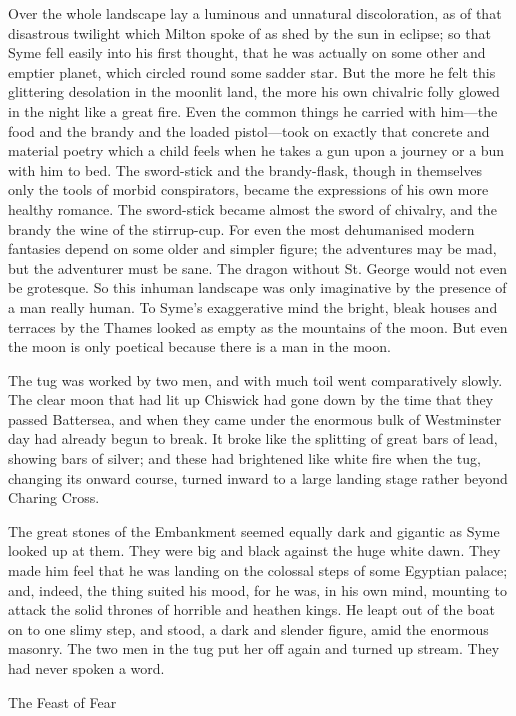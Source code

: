 Over the whole landscape lay a luminous and unnatural discoloration, as of that disastrous twilight which Milton spoke of as shed by the sun in eclipse; so that Syme fell easily into his first thought, that he was actually on some other and emptier planet, which circled round some sadder star. But the more he felt this glittering desolation in the moonlit land, the more his own chivalric folly glowed in the night like a great fire. Even the common things he carried with him⁠—the food and the brandy and the loaded pistol⁠—took on exactly that concrete and material poetry which a child feels when he takes a gun upon a journey or a bun with him to bed. The sword-stick and the brandy-flask, though in themselves only the tools of morbid conspirators, became the expressions of his own more healthy romance. The sword-stick became almost the sword of chivalry, and the brandy the wine of the stirrup-cup. For even the most dehumanised modern fantasies depend on some older and simpler figure; the adventures may be mad, but the adventurer must be sane. The dragon without St. George would not even be grotesque. So this inhuman landscape was only imaginative by the presence of a man really human. To Syme’s exaggerative mind the bright, bleak houses and terraces by the Thames looked as empty as the mountains of the moon. But even the moon is only poetical because there is a man in the moon.

The tug was worked by two men, and with much toil went comparatively slowly. The clear moon that had lit up Chiswick had gone down by the time that they passed Battersea, and when they came under the enormous bulk of Westminster day had already begun to break. It broke like the splitting of great bars of lead, showing bars of silver; and these had brightened like white fire when the tug, changing its onward course, turned inward to a large landing stage rather beyond Charing Cross.

The great stones of the Embankment seemed equally dark and gigantic as Syme looked up at them. They were big and black against the huge white dawn. They made him feel that he was landing on the colossal steps of some Egyptian palace; and, indeed, the thing suited his mood, for he was, in his own mind, mounting to attack the solid thrones of horrible and heathen kings. He leapt out of the boat on to one slimy step, and stood, a dark and slender figure, amid the enormous masonry. The two men in the tug put her off again and turned up stream. They had never spoken a word.

\chap The Feast of Fear

